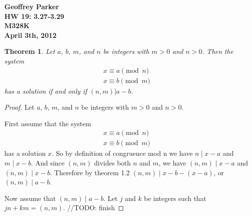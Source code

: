 \documentclass[12pt,leqno]{article}
\numberwithin{equation}{section}
\newtheorem{thm}{Theorem}[section]
\theoremstyle{definition}
\begin{document}
\thispagestyle{plain}
\begin{flushright}
\large{\textbf{Geoffrey Parker\\
HW 19: 3.27-3.29\\
M328K \\
April 3th, 2012 \\}}
\end{flushright}

\markboth{}{} \setcounter{section}{0} \baselineskip=18pt

\setcounter{tocdepth}{4}



\setcounter{section}{3}

\setcounter{thm}{26}

\begin{thm}
Let $a$, $b$, $m$, and $n$ be integers with $m > 0$ and $n > 0$.
Then the system
\[ \begin{array}{l}
x \equiv a \pmod{n} \\
x \equiv b \pmod{m} \end{array} \] has a solution if and only if
$(n, m)| a - b$.
\end{thm}

\begin{proof}[Proof]
Let $a$, $b$, $m$, and $n$ be integers with $m > 0$ and $n > 0$.

First assume that the system 
\[ \begin{array}{l}
x \equiv a \pmod{n} \\
x \equiv b \pmod{m} \end{array} \] has a solution $x$.  So by definition of congruence mod n we have $n \mid x - a$ and $m \mid x - b$.  And since $(n, m)$ divides both $n$ and $m$, we have $(n, m) \mid x - a$ and $(n, m) \mid x - b$.  Therefore by theorem 1.2 $(n, m) \mid x - b - (x - a)$, or $(n, m) \mid a - b$.

Now assume that $(n, m) \mid a - b$. Let $j$ and $k$ be integers such that $jn + km = (n, m)$. //TODO: finish
\end{proof}
\end{document}
